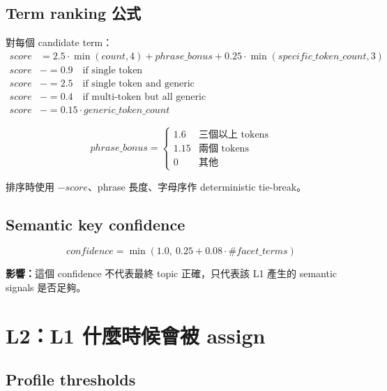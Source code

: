 \documentclass[11pt]{article}
\newcommand{\impact}[1]{\textbf{影響：}#1}
\begin{document}
\subsection{Term ranking 公式}

對每個 candidate term：
\[
\begin{aligned}
score &= 2.5 \cdot \min(count,4) + phrase\_bonus
      + 0.25 \cdot \min(specific\_token\_count,3)\\
score &\mathrel{-}= 0.9 \quad \text{if single token}\\
score &\mathrel{-}= 2.5 \quad \text{if single token and generic}\\
score &\mathrel{-}= 0.4 \quad \text{if multi-token but all generic}\\
score &\mathrel{-}= 0.15 \cdot generic\_token\_count
\end{aligned}
\]

\[
phrase\_bonus =
\begin{cases}
1.6 & \text{三個以上 tokens}\\
1.15 & \text{兩個 tokens}\\
0 & \text{其他}
\end{cases}
\]

排序時使用 \(-score\)、phrase 長度、字母序作 deterministic tie-break。

\subsection{Semantic key confidence}

\[
confidence = \min(1.0,\ 0.25 + 0.08 \cdot \#facet\_terms)
\]

\impact{這個 confidence 不代表最終 topic 正確，只代表該 L1 產生的 semantic signals 是否足夠。}

\section{L2：L1 什麼時候會被 assign}

\subsection{Profile thresholds}
\end{document}
